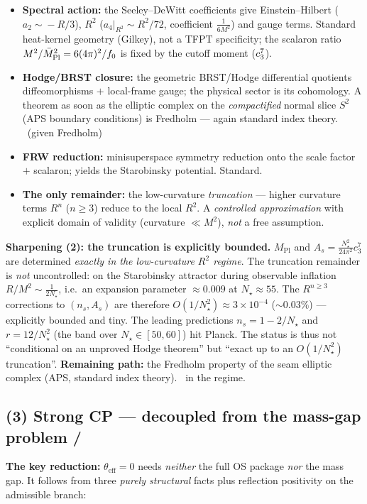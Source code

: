 \begin{itemize}[leftmargin=1.4em]
\item \textbf{Spectral action:} the Seeley--DeWitt coefficients give Einstein--Hilbert
      ($a_2\!\sim\!-R/3$), $R^2$ ($a_4|_{R^2}\!\sim\!R^2/72$, coefficient $\tfrac1{6M^2}$) and gauge terms.
      Standard heat-kernel geometry (Gilkey), not a TFPT specificity; the scalaron ratio
      $M^2/\bar M_{\mathrm{Pl}}^2=6(4\pi)^2/f_0$ is fixed by the cutoff moment ($c_3^7$). \mE\
\item \textbf{Hodge/BRST closure:} the geometric BRST/Hodge differential quotients diffeomorphisms $+$
      local-frame gauge; the physical sector is its cohomology. A theorem as soon as the elliptic
      complex on the \emph{compactified} normal slice $S^2$ (APS boundary conditions) is
      Fredholm --- again standard index theory. \mE\ (given Fredholm)
\item \textbf{FRW reduction:} minisuperspace symmetry reduction onto the scale factor $+$ scalaron;
      yields the Starobinsky potential. Standard. \mE
\item \textbf{The only remainder:} the low-curvature \emph{truncation} --- higher curvature terms
      $R^n$ ($n\!\ge\!3$) reduce to the local $R^2$. A \emph{controlled approximation} with explicit
      domain of validity (curvature $\ll M^2$), \emph{not} a free assumption.
\end{itemize}

\par\smallskip\noindent\textbf{Sharpening (2): the truncation is explicitly bounded.}
$M_{\mathrm{Pl}}$ and $A_s=\tfrac{N_\star^2}{24\pi^2}c_3^7$ are determined \emph{exactly in the
low-curvature $R^2$ regime}. The truncation remainder is \emph{not} uncontrolled: on the Starobinsky
attractor during observable inflation $R/M^2\sim\tfrac1{2N_\star}$, i.e.\ an expansion parameter
$\approx0.009$ at $N_\star\!\approx\!55$. The $R^{n\ge3}$ corrections to $(n_s,A_s)$ are therefore
$O(1/N_\star^2)\approx3\times10^{-4}$ ($\sim0.03\%$) --- explicitly bounded and tiny. The leading
predictions $n_s=1-2/N_\star$ and $r=12/N_\star^2$ (the band over $N_\star\in[50,60]$) hit Planck. The
status is thus not ``conditional on an unproved Hodge theorem'' but ``exact up to an
$O(1/N_\star^2)$ truncation''. \textbf{Remaining path:} the Fredholm property of the seam elliptic
complex (APS, standard index theory). \mE\ in the regime.

\subsection*{(3) Strong CP --- decoupled from the mass-gap problem \mE/\mC}
\textbf{The key reduction:} $\theta_{\mathrm{eff}}=0$ needs \emph{neither} the full OS package \emph{nor}
the mass gap. It follows from three \emph{purely structural} facts plus reflection positivity on the
admissible branch:


